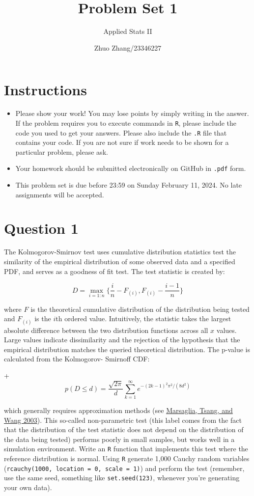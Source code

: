 \documentclass[12pt,letterpaper]{article}
\title{Problem Set 1}
\date{Zhuo Zhang/23346227}
\author{Applied Stats II}
\begin{document}
	\maketitle
	\section*{Instructions}
	\begin{itemize}
	\item Please show your work! You may lose points by simply writing in the answer. If the problem requires you to execute commands in \texttt{R}, please include the code you used to get your answers. Please also include the \texttt{.R} file that contains your code. If you are not sure if work needs to be shown for a particular problem, please ask.
\item Your homework should be submitted electronically on GitHub in \texttt{.pdf} form.
\item This problem set is due before 23:59 on Sunday February 11, 2024. No late assignments will be accepted.
	\end{itemize}

	\vspace{.25cm}
\section*{Question 1} 
\vspace{.25cm}
\noindent The Kolmogorov-Smirnov test uses cumulative distribution statistics test the similarity of the empirical distribution of some observed data and a specified PDF, and serves as a goodness of fit test. The test statistic is created by:

$$D = \max_{i=1:n} \Big\{ \frac{i}{n}  - F_{(i)}, F_{(i)} - \frac{i-1}{n} \Big\}$$

\noindent where $F$ is the theoretical cumulative distribution of the distribution being tested and $F_{(i)}$ is the $i$th ordered value. Intuitively, the statistic takes the largest absolute difference between the two distribution functions across all $x$ values. Large values indicate dissimilarity and the rejection of the hypothesis that the empirical distribution matches the queried theoretical distribution. The p-value is calculated from the Kolmogorov-
Smirnoff CDF:

+$$p(D \leq d)= \frac{\sqrt {2\pi}}{d} \sum _{k=1}^{\infty }e^{-(2k-1)^{2}\pi ^{2}/(8d^{2})}$$

\noindent which generally requires approximation methods (see \href{https://core.ac.uk/download/pdf/25787785.pdf}{Marsaglia, Tsang, and Wang 2003}). This so-called non-parametric test (this label comes from the fact that the distribution of the test statistic does not depend on the distribution of the data being tested) performs poorly in small samples, but works well in a simulation environment. Write an \texttt{R} function that implements this test where the reference distribution is normal. Using \texttt{R} generate 1,000 Cauchy random variables (\texttt{rcauchy(1000, location = 0, scale = 1)}) and perform the test (remember, use the same seed, something like \texttt{set.seed(123)}, whenever you're generating your own data).\\
	
\end{document}
